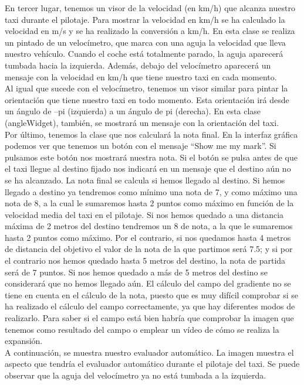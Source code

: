 En tercer lugar, tenemos un visor de la velocidad (en km/h) que alcanza nuestro taxi durante el pilotaje. Para mostrar la velocidad en km/h se ha calculado la velocidad en m/s y se ha realizado la conversión a km/h. En esta clase se realiza un pintado de un velocímetro, que marca con una aguja la velocidad que lleva nuestro vehículo. Cuando el coche está totalmente parado, la aguja aparecerá tumbada hacia la izquierda. Además, debajo del velocímetro aparecerá un mensaje con la velocidad en km/h que tiene nuestro taxi en cada momento.\\

Al igual que sucede con el velocímetro, tenemos un visor similar para pintar la orientación que tiene nuestro taxi en todo momento. Esta orientación irá desde un ángulo de –pi (izquierda) a un ángulo de pi (derecha). En esta clase (angleWidget), también, se mostrará un mensaje con la orientación del taxi.\\

Por último, tenemos la clase que nos calculará la nota final. En la interfaz gráfica podemos ver que tenemos un botón con el mensaje ``Show me my mark''. Si pulsamos este botón nos mostrará nuestra nota. Si el botón se pulsa antes de que el taxi llegue al destino fijado nos indicará en un mensaje que el destino aún no se ha alcanzado. La nota final se calcula si hemos llegado al destino. Si hemos llegado a destino ya tendremos como mínimo una nota de 7, y como máximo una nota de 8, a la cual le sumaremos hasta 2 puntos como máximo en función de la velocidad media del taxi en el pilotaje. Si nos hemos quedado a una distancia máxima de 2 metros del destino tendremos un 8 de nota, a la que le sumaremos hasta 2 puntos como máximo. Por el contrario, si nos quedamos hasta 4 metros de distancia del objetivo el valor de la nota de la que partimos será 7.5; y si por el contrario nos hemos quedado hasta 5 metros del destino, la nota de partida será de 7 puntos. Si nos hemos quedado a más de 5 metros del destino se considerará que no hemos llegado aún. El cálculo del campo del gradiente no se tiene en cuenta en el cálculo de la nota, puesto que es muy difícil comprobar si se ha realizado el cálculo del campo correctamente, ya que hay diferentes modos de realizarlo. Para saber si el campo está bien habría que comprobar la imagen que tenemos como resultado del campo o emplear un vídeo de cómo se realiza la expansión.\\

A continuación, se muestra nuestro evaluador automático. La imagen muestra el aspecto que tendría el evaluador automático durante el pilotaje del taxi. Se puede observar que la aguja del velocímetro ya no está tumbada a la izquierda.\\


